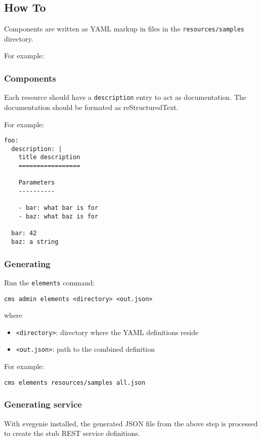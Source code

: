 \subsection{How To}

Components are written as YAML markup in files in the
\verb+resources/samples+ directory.

For example:


\subsubsection{Components}

Each resource should have a \verb+description+ entry to act as
documentation. The documentation should be formated as  reStructuredText.

For example:

\begin{verbatim}
foo:
  description: |
    title description
    =================

    Parameters
    ----------

    - bar: what bar is for
    - baz: what baz is for

  bar: 42
  baz: a string
\end{verbatim}


\subsubsection{Generating}

Run the \verb+elements+ command:

\begin{verbatim}
cms admin elements <directory> <out.json>
\end{verbatim}

where

\begin{itemize}
\item \verb+<directory>+: directory where the YAML definitions reside
\item \verb+<out.json>+: path to the combined definition
\end{itemize}


For example:

\begin{verbatim}
cms elements resources/samples all.json
\end{verbatim}


\subsubsection{Generating service}

With evegenie installed, the generated JSON file from the above step
is processed to create the stub REST service definitions.
